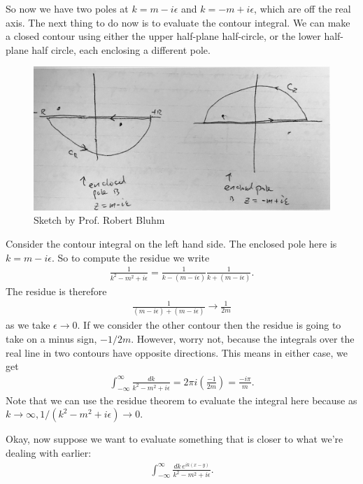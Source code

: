 \documentclass{book}
\theoremstyle{definition}
\newcommand{\f}[2]{\frac{#1}{#2}}
\newcommand{\lp}{\left(}
\newcommand{\rp}{\right)}
\begin{document}
So now we have two poles at $k = m-i\epsilon$ and $k = -m + i\epsilon$, which are off the real axis. The next thing to do now is to evaluate the contour integral. We can make a closed contour using either the upper half-plane half-circle, or the lower half-plane half circle, each enclosing a different pole. 

\begin{figure}[!htb]
	\centering
	\includegraphics*[scale=0.1]{poles}
	\caption{Sketch by Prof. Robert Bluhm}
\end{figure}

Consider the contour integral on the left hand side. The enclosed pole here is $k = m - i\epsilon$. So to compute the residue we write
\begin{align}
\f{1}{k^2 - m^2 + i\epsilon} = \f{1}{k - (m - i\epsilon)}\f{1}{k + (m - i\epsilon)}.
\end{align}
The residue is therefore
\begin{align}
\f{1}{(m - i\epsilon) + (m - i\epsilon)} \to \f{1}{2m}
\end{align}
as we take $\epsilon \to 0$. If we consider the other contour then the residue is going to take on a minus sign, $-1/2m$. However, worry not, because the integrals over the real line in two contours have opposite directions. This means in either case, we get
\begin{align}
\int^\infty_{-\infty}\f{dk}{k^2 - m^2 + i\epsilon} = 2\pi i \lp \f{-1}{2m} \rp = \boxed{\f{-i\pi}{m}}.
\end{align}
Note that we can use the residue theorem to evaluate the integral here because as $k\to \infty, 1/(k^2 - m^2 + i\epsilon) \to 0$.

Okay, now suppose we want to evaluate something that is closer to what we're dealing with earlier:
\begin{align}
\int^\infty_{-\infty} \f{dk\, e^{ik(x-y)}}{k^2 - m^2 + i\epsilon}.
\end{align}
\end{document}

